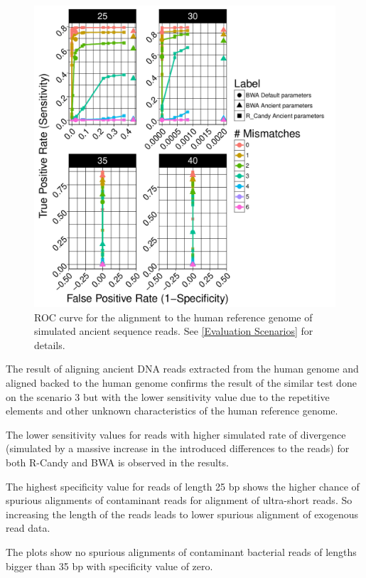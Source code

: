 \documentclass[11pt,a4paper]{report}
\begin{document}
\begin{figure}[H]
\centering
\includegraphics[width=12cm]{pictures/bROC_DS4_emp.pdf}


\caption{
ROC curve for the alignment to the human reference genome of simulated ancient
sequence reads. See \ref{Evaluation Scenarios} for details.
}

\label{DS4_emp}
\end{figure}



The result of aligning ancient DNA reads extracted from the human genome
and aligned backed to the human genome confirms the result of the similar
test done on the scenario 3 but with the lower sensitivity value due to 
the repetitive elements and other unknown characteristics of the human 
reference genome.

The lower sensitivity values for reads with higher simulated rate of 
divergence (simulated by a massive increase in the introduced differences
to the reads) for both R-Candy and BWA is observed in the results.

The highest specificity value for reads of length 25 bp shows the higher 
chance of spurious alignments of contaminant reads for alignment of 
ultra-short reads.
So increasing the length of the reads leads to lower spurious alignment 
of exogenous read data.

The plots show no spurious alignments of  contaminant bacterial reads of 
lengths bigger than 35 bp with specificity value of zero.
\end{document}
